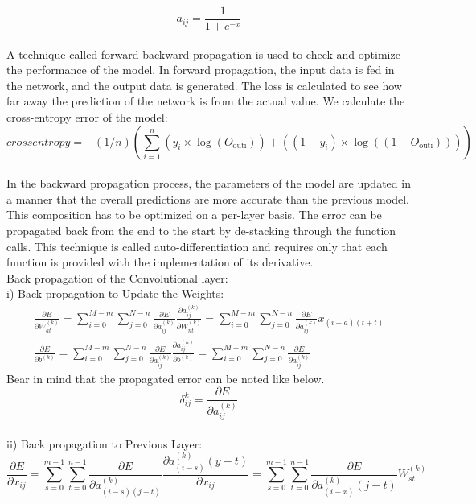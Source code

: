 \documentclass[12pt]{revtex4}
\begin{document}
\begin{equation}a_{i j}=\frac{1}{1+e^{-x}}\end{equation}
\\A technique called forward-backward propagation is used to check and optimize the performance of the model. In forward propagation, the input data is fed in the network, and the output data is generated. The loss is calculated to see how far away the prediction of the network is from the actual value. We calculate the cross-entropy error of the model: 
\begin{equation}crossentropy=-(1 / n)\left(\sum_{i=1}^{n}\left(y_{i} \times \log \left(O_{\text {outi}}\right)\right)+\left(\left(1-y_{i}\right) \times \log \left(\left(1-O_{\text {outi}}\right)\right)\right)\right)\end{equation}
\\In the backward propagation process, the parameters of the model are updated in a manner that the overall predictions are more accurate than the previous model. This composition has to be optimized on a per-layer basis. The error can be propagated back from the end to the start by de-stacking through the function calls. This technique is called auto-differentiation and requires only that each function is provided with the implementation of its derivative.
\\Back propagation of the Convolutional layer:
\\i) Back propagation to Update the Weights:
\begin{equation}\begin{array}{c}
\frac{\partial E}{\partial W_{a t}^{(k)}}=\sum_{i=0}^{M-m} \sum_{j=0}^{N-n} \frac{\partial E}{\partial a_{i j}^{(k)}} \frac{\partial a_{i j}^{(k)}}{\partial W_{n t}^{(k)}}=\sum_{i=0}^{M-m} \sum_{j=0}^{N-n} \frac{\partial E}{\partial a_{i j}^{(k)}} x_{(i+a)(t+t)} \\
\frac{\partial E}{\partial b^{(k)}}=\sum_{i=0}^{M-m} \sum_{j=0}^{N-n} \frac{\partial E}{\partial a_{i j}^{(k)}} \frac{\partial a_{i j}^{(k)}}{\partial b^{(k)}}=\sum_{i=0}^{M-m} \sum_{j=0}^{N-n} \frac{\partial E}{\partial a_{i j}^{(k)}}
\end{array}\end{equation}
Bear in mind that the propagated error can be noted like below.
\[
\delta_{i j}^{k}=\frac{\partial E}{\partial a_{i j}^{(k)}}
\]
\\ii) Back propagation to Previous Layer:
\begin{equation}\frac{\partial E}{\partial x_{i j}}=\sum_{s=0}^{m-1} \sum_{t=0}^{n-1} \frac{\partial E}{\partial a_{(i-s)(j-t)}^{(k)}} \frac{\partial a_{(i-s)}^{(k)}(y-t)}{\partial x_{i j}}=\sum_{s=0}^{m-1} \sum_{t=0}^{n-1} \frac{\partial E}{\partial a_{(i-x)}^{(k)}(j-t)} W_{s t}^{(k)}\end{equation}
\end{document}
